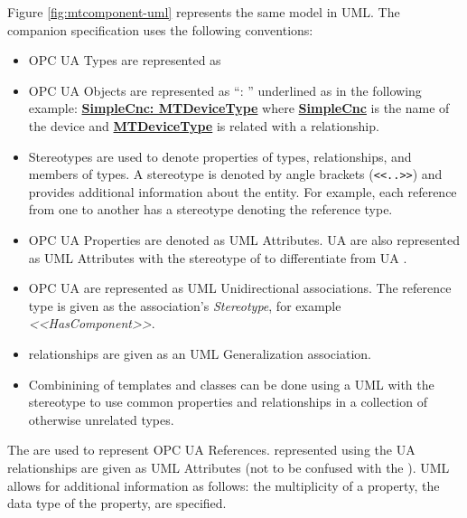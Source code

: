 

Figure \ref{fig:mtcomponent-uml} represents the same model in UML. The companion specification uses the following conventions:

\begin{itemize}
  \item OPC UA Types are represented as 
  \item OPC UA Objects are represented as ``: '' underlined as in the following example: \textbf{\underline{SimpleCnc: MTDeviceType}} where \textbf{\underline{SimpleCnc}} is the name of the device and  \textbf{\underline{MTDeviceType}} is related with a  relationship.
  \item Stereotypes are used to denote properties of types, relationships, and members of types. A stereotype is denoted by angle brackets (\texttt{<<..>>}) and provides additional information about the entity. For example, each reference from one  to another has a stereotype denoting the reference type.
  \item OPC UA Properties are denoted as UML Attributes. UA  are also represented as UML Attributes with the stereotype of  to differentiate from UA .
  \item OPC UA   are represented as UML Unidirectional associations. The reference type is given as the association's \textit{Stereotype}, for example \textit{<<HasComponent>>}. 
  \item {} relationships are given as an UML Generalization association.
  \item Combinining of templates and classes can be done using a UML  with the stereotype  to use common properties and relationships in a collection of otherwise unrelated types.
\end{itemize}

The  are used to represent OPC UA References.  represented using the UA  relationships are given as UML Attributes (not to be confused with the ). UML allows for additional information as follows:  the multiplicity of a property, the data type of the property, are specified.


\FloatBarrier

